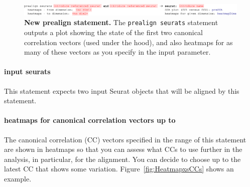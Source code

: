 \begin{figure}[h!tbp]
  \centering
    \includegraphics[width=\figWidthWide]{figures/PrealignSeurat.pdf}
    \caption[New prealign statement.]{\textbf{New prealign statement.} The \texttt{prealign
    seurats} statement outputs a plot showing the state of the first two canonical correlation vectors
    (used under the hood), and also heatmaps for as many of these vectors as you specify in the input
    parameter.}
\label{fig:PrealignSeurat}
\end{figure}

\paragraph{input seurats} This statement expects two input Seurat objects that will be aligned
by this statement.

\paragraph{heatmaps for canonical correlation vectors up to} The canonical correlation (CC) vectors specified in the
range of this statement are shown in heatmaps so that you can assess what CCs to use further
in the analysis, in particular, for the alignment. You can decide to choose up to the latest CC
that shows some variation. Figure~\ref{fig:HeatmapxsCCs} shows an example.

